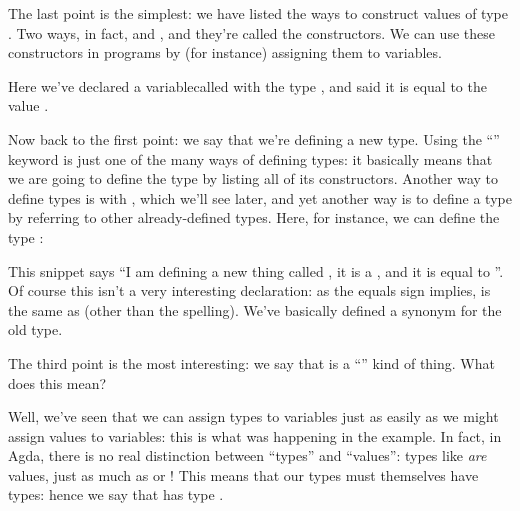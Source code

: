 The last point is the simplest: we have listed the ways to construct values of
type .
Two ways, in fact,  and
, and they're called the constructors.
We can use these constructors in programs by (for instance) assigning them to
variables.
\begin{multicols}{2}\centering
  \columnbreak
\end{multicols}\vspace{-2\baselineskip}\noindent
Here we've declared a variable\footnotemark\;called  with
the type , and said it is equal to the value
.


Now back to the first point: we say that we're defining a new 
type.
Using the ``'' keyword is just one of the many ways of
defining types: it basically means that we are going to define the type by
listing all of its constructors.
Another way to define types is with , which we'll see later,
and yet another way is to define a type by referring to other already-defined types.
Here, for instance, we can define the type :
\begin{agdalisting*}
\end{agdalisting*}
This snippet says ``I am defining a new thing called , it
is a , and it is equal to ''.
Of course this isn't a very interesting declaration: as the equals sign implies,
 is the same as  (other than the
spelling).
We've basically defined a synonym for the old type.

The third point is the most interesting: we say that  is a
``'' kind of thing.
What does this mean?

Well, we've seen that we can assign types to variables just as easily as we
might assign values to variables: this is what was happening in the
 example.
In fact, in Agda, there is no real distinction between ``types'' and ``values'':
types like  \emph{are} values, just as much as
 or !
This means that our types must themselves have types: hence we say that
 has type .


